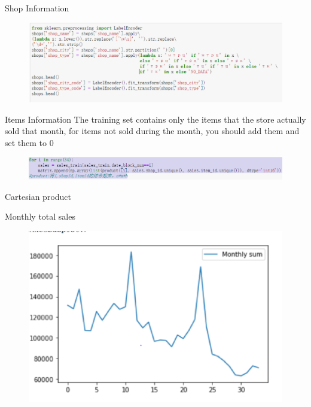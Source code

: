 \documentclass[
 size=14pt,
 paper=smartboard,  %
 mode=present, 		%
 display=slides, 	%
 style=tuliplab,  	%
 pauseslide,
 fleqn,leqno]{powerdot}
\begin{document}
\begin{slide}[toc=,bm=]{Shop Information}
  \begin{figure}
    \includegraphics[scale=0.5]{picture/data_12.eps}
  \end{figure}
\end{slide}


\begin{slide}[toc=,bm=]{Items Information}
  The training set contains only the items that the store actually sold that month,
  for items not sold during the month, you should add them and set them to 0
  \begin{figure}
    \includegraphics[scale=0.5]{picture/data_15.eps}
  \end{figure}
   Cartesian product
\end{slide}

\begin{slide}[toc=,bm=]{Monthly total sales}
 
  \begin{figure}
    \includegraphics[scale=0.5]{picture/data_18.eps}
  \end{figure}
\end{slide}
\end{document}
